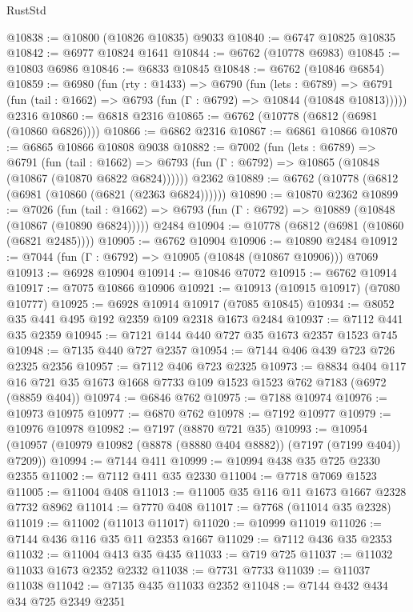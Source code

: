 \begin{lexlean}{RustStd}
\begin{coremodule}
@10838 := @10800 (@10826 @10835) @9033
@10840 := @6747 @10825 @10835
@10842 := @6977 @10824 @1641
@10844 := @6762 (@10778 @6983)
@10845 := @10803 @6986
@10846 := @6833 @10845
@10848 := @6762 (@10846 @6854)
@10859 := @6980
    (fun (rty : @1433) =>
    @6790
      (fun (lets : @6789) =>
      @6791 (fun (tail : @1662) => @6793 (fun (Γ : @6792) => @10844 (@10848 @10813)))))
    @2316
@10860 := @6818 @2316
@10865 := @6762 (@10778 (@6812 (@6981 (@10860 @6826))))
@10866 := @6862 @2316
@10867 := @6861 @10866
@10870 := @6865 @10866 @10808 @9038
@10882 := @7002
    (fun (lets : @6789) =>
    @6791
      (fun (tail : @1662) =>
      @6793 (fun (Γ : @6792) => @10865 (@10848 (@10867 (@10870 @6822 @6824))))))
    @2362
@10889 := @6762 (@10778 (@6812 (@6981 (@10860 (@6821 (@2363 @6824))))))
@10890 := @10870 @2362
@10899 := @7026
    (fun (tail : @1662) => @6793 (fun (Γ : @6792) => @10889 (@10848 (@10867 (@10890 @6824)))))
    @2484
@10904 := @10778 (@6812 (@6981 (@10860 (@6821 @2485))))
@10905 := @6762 @10904
@10906 := @10890 @2484
@10912 := @7044 (fun (Γ : @6792) => @10905 (@10848 (@10867 @10906))) @7069
@10913 := @6928 @10904
@10914 := @10846 @7072
@10915 := @6762 @10914
@10917 := @7075 @10866 @10906
@10921 := @10913 (@10915 @10917) (@7080 @10777)
@10925 := @6928 @10914 @10917 (@7085 @10845)
@10934 := @8052 @35 @441 @495 @192 @2359 @109 @2318 @1673 @2484
@10937 := @7112 @441 @35 @2359
@10945 := @7121 @144 @440 @727 @35 @1673 @2357 @1523 @745
@10948 := @7135 @440 @727 @2357
@10954 := @7144 @406 @439 @723 @726 @2325 @2356
@10957 := @7112 @406 @723 @2325
@10973 := @8834
    @404
    @117
    @16
    @721
    @35
    @1673
    @1668
    @7733
    @109
    @1523
    @1523
    @762
    @7183
    (@6972 (@8859 @404))
@10974 := @6846 @762
@10975 := @7188 @10974
@10976 := @10973 @10975
@10977 := @6870 @762
@10978 := @7192 @10977
@10979 := @10976 @10978
@10982 := @7197 (@8870 @721 @35)
@10993 := @10954 (@10957 (@10979 @10982 (@8878 (@8880 @404 @8882)) (@7197 (@7199 @404)) @7209))
@10994 := @7144 @411
@10999 := @10994 @438 @35 @725 @2330 @2355
@11002 := @7112 @411 @35 @2330
@11004 := @7718 @7069 @1523
@11005 := @11004 @408
@11013 := @11005 @35 @116 @11 @1673 @1667 @2328 @7732 @8962
@11014 := @7770 @408
@11017 := @7768 (@11014 @35 @2328)
@11019 := @11002 (@11013 @11017)
@11020 := @10999 @11019
@11026 := @7144 @436 @116 @35 @11 @2353 @1667
@11029 := @7112 @436 @35 @2353
@11032 := @11004 @413 @35 @435
@11033 := @719 @725
@11037 := @11032 @11033 @1673 @2352 @2332
@11038 := @7731 @7733
@11039 := @11037 @11038
@11042 := @7135 @435 @11033 @2352
@11048 := @7144 @432 @434 @34 @725 @2349 @2351

\end{coremodule}
\end{lexlean}

